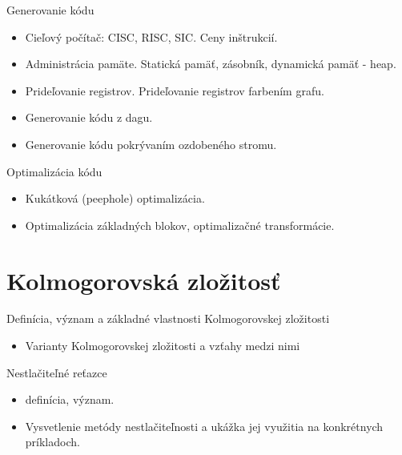 \documentclass[a4paper]{report}
\begin{document}
\begin{zadanie}{Generovanie kódu}
\begin{itemize}
 \item Cieľový počítač: CISC, RISC, SIC. Ceny inštrukcií.
 \item Administrácia pamäte. Statická pamäť, zásobník, dynamická pamäť - heap.
 \item Prideľovanie registrov. Prideľovanie registrov farbením grafu.
 \item Generovanie kódu z dagu.
 \item Generovanie kódu pokrývaním ozdobeného stromu.
\end{itemize}
\end{zadanie}

\begin{zadanie}{Optimalizácia kódu}
\begin{itemize}
 \item Kukátková (peephole) optimalizácia.
 \item Optimalizácia základných blokov, optimalizačné transformácie.
\end{itemize}
\end{zadanie}

\chapter{Kolmogorovská zložitosť}

\begin{zadanie}{Definícia, význam a základné vlastnosti Kolmogorovskej zložitosti}
\begin{itemize}
 \item Varianty Kolmogorovskej zložitosti a vzťahy medzi nimi
\end{itemize}
\end{zadanie}

\begin{zadanie}{Nestlačiteľné reťazce}
\begin{itemize}
 \item definícia, význam.
 \item Vysvetlenie metódy nestlačiteľnosti a ukážka jej využitia na konkrétnych príkladoch.
\end{itemize}
\end{zadanie}
\end{document}
